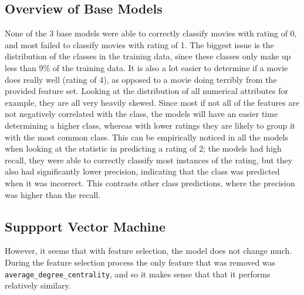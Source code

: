 
\subsection{Overview of Base Models}
None of the 3 base models were able to correctly classify movies with rating of 0, and most failed to classify movies with rating of 1. The biggest issue is the distribution of the classes in the training data, since these classes only make up less than 9\% of the training data. It is also a lot easier to determine if a movie does really well (rating of 4), as opposed to a movie doing terribly from the provided feature set. Looking at the distribution of all numerical attributes for example, they are all very heavily skewed. Since most if not all of the features are not negatively correlated with the class, the models will have an easier time determining a higher class, whereas with lower ratings they are likely to group it with the most common class. This can be empirically noticed in all the models when looking at the statistic in predicting a rating of 2; the models had high recall, they were able to correctly classify most instances of the rating, but they also had significantly lower precision, indicating that the class was predicted when it was incorrect. This contrasts other class predictions, where the precision was higher than the recall.

\subsection{Suppport Vector Machine}


However, it seems that with feature selection, the model does not change much. During the feature selection process the only feature that was removed was \texttt{average\_degree\_centrality}, and so it makes sense that that it performs relatively similary. 

